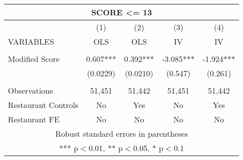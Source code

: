 \begin{tabular}{lcccc}
\multicolumn{5}{c}{SCORE <= 13} \\ \hline
 & (1) & (2) & (3) & (4) \\
VARIABLES & OLS & OLS & IV & IV \\ \hline
 &  &  &  &  \\
Modified Score & 0.607*** & 0.392*** & -3.085*** & -1.924*** \\
 & (0.0229) & (0.0210) & (0.547) & (0.261) \\
 &  &  &  &  \\
Observations & 51,451 & 51,442 & 51,451 & 51,442 \\
Restaurant Controls & No & Yes & No & Yes \\
 Restaurant FE & No & No & No & No \\ \hline
\multicolumn{5}{c}{ Robust standard errors in parentheses} \\
\multicolumn{5}{c}{ *** p$<$0.01, ** p$<$0.05, * p$<$0.1} \\
\end{tabular}
